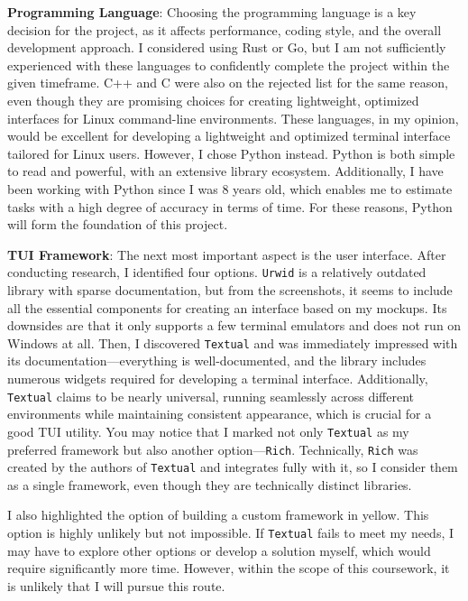 \documentclass[10pt , a4paper]{report}
\begin{document}
\textbf{Programming Language}: Choosing the programming language is a key decision for the project, as it affects performance, coding style, and the overall development approach. I considered using Rust or Go, but I am not sufficiently experienced with these languages to confidently complete the project within the given timeframe. C++ and C were also on the rejected list for the same reason, even though they are promising choices for creating lightweight, optimized interfaces for Linux command-line environments. These languages, in my opinion, would be excellent for developing a lightweight and optimized terminal interface tailored for Linux users. However, I chose Python instead. Python is both simple to read and powerful, with an extensive library ecosystem. Additionally, I have been working with Python since I was 8 years old, which enables me to estimate tasks with a high degree of accuracy in terms of time. For these reasons, Python will form the foundation of this project.

\textbf{TUI Framework}: The next most important aspect is the user interface. After conducting research, I identified four options. \texttt{Urwid} is a relatively outdated library with sparse documentation, but from the screenshots, it seems to include all the essential components for creating an interface based on my mockups. Its downsides are that it only supports a few terminal emulators and does not run on Windows at all. Then, I discovered \texttt{Textual} and was immediately impressed with its documentation—everything is well-documented, and the library includes numerous widgets required for developing a terminal interface. Additionally, \texttt{Textual} claims to be nearly universal, running seamlessly across different environments while maintaining consistent appearance, which is crucial for a good TUI utility. You may notice that I marked not only \texttt{Textual} as my preferred framework but also another option—\texttt{Rich}. Technically, \texttt{Rich} was created by the authors of \texttt{Textual} and integrates fully with it, so I consider them as a single framework, even though they are technically distinct libraries.

I also highlighted the option of building a custom framework in yellow. This option is highly unlikely but not impossible. If \texttt{Textual} fails to meet my needs, I may have to explore other options or develop a solution myself, which would require significantly more time. However, within the scope of this coursework, it is unlikely that I will pursue this route.
\end{document}
